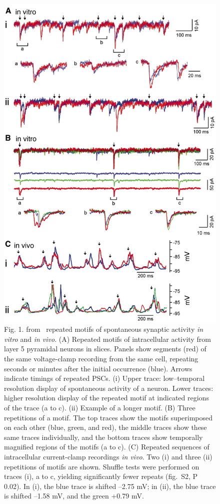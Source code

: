 \documentclass[brainsci, %
               review,submit,pdftex,moreauthors
               ]{Definitions/mdpi}
\begin{document}
\begin{figure}
\centering
\includegraphics[width=.6\linewidth]{figures/Ikegaya2004zse0150424620001.jpeg}%
\caption{Fig. 1. from~\citep{ikegaya_synfire_2004} repeated motifs of spontaneous synaptic activity \textit{in vitro} and \textit{in vivo}. (A) Repeated motifs of intracellular activity from layer 5 pyramidal neurons in slices. Panels show segments (red) of the same voltage-clamp recording from the same cell, repeating seconds or minutes after the initial occurrence (blue). Arrows indicate timings of repeated PSCs. (i) Upper trace: low--temporal resolution display of spontaneous activity of a neuron. Lower traces: higher resolution display of the repeated motif at indicated regions of the trace (a to c). (ii) Example of a longer motif. (B) Three repetitions of a motif. The top traces show the motifs superimposed on each other (blue, green, and red), the middle traces show these same traces individually, and the bottom traces show temporally magnified regions of the motifs (a to c). (C) Repeated sequences of intracellular current-clamp recordings \textit{in vivo}. Two (i) and three (ii) repetitions of motifs are shown. Shuffle tests were performed on traces (i), a to c, yielding significantly fewer repeats (fig.~S2, P  0.02). In (i), the blue trace is shifted --2.75 mV; in (ii), the blue trace is shifted --1.58 mV, and the green +0.79 mV.}\label{fig:Ikegaya2004}
\end{figure}
\end{document}
